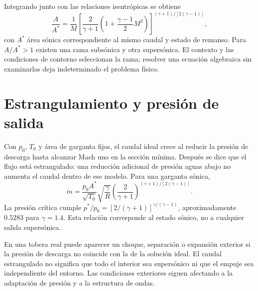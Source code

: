 Integrando junto con las relaciones isentrópicas se obtiene
\begin{equation}
 \frac{A}{A^*}=\frac{1}{M}
 \left[\frac{2}{\gamma+1}\left(1+\frac{\gamma-1}{2}M^2\right)\right]^{(\gamma+1)/[2(\gamma-1)]},
\end{equation}
con $A^*$ área sónica correspondiente al mismo caudal y estado de remanso. Para $A/A^*>1$ existen una rama subsónica y otra supersónica. El contexto y las condiciones de contorno seleccionan la rama; resolver una ecuación algebraica sin examinarlas deja indeterminado el problema físico.

\section{Estrangulamiento y presión de salida}
Con $p_0$, $T_0$ y área de garganta fijos, el caudal ideal crece al reducir la presión de descarga hasta alcanzar Mach uno en la sección mínima. Después se dice que el flujo está estrangulado: una reducción adicional de presión aguas abajo no aumenta el caudal dentro de ese modelo. Para una garganta sónica,
\begin{equation}
 \dot m=\frac{p_0A^*}{\sqrt{T_0}}\sqrt{\frac{\gamma}{R}}
 \left(\frac{2}{\gamma+1}\right)^{(\gamma+1)/[2(\gamma-1)]}.
\end{equation}
La presión crítica cumple $p^*/p_0=[2/(\gamma+1)]^{\gamma/(\gamma-1)}$, aproximadamente $0.5283$ para $\gamma=1.4$. Esta relación corresponde al estado sónico, no a cualquier salida supersónica.

En una tobera real puede aparecer un choque, separación o expansión exterior si la presión de descarga no coincide con la de la solución ideal. El caudal estrangulado no significa que todo el interior sea supersónico ni que el empuje sea independiente del entorno. Las condiciones exteriores siguen afectando a la adaptación de presión y a la estructura de ondas.

